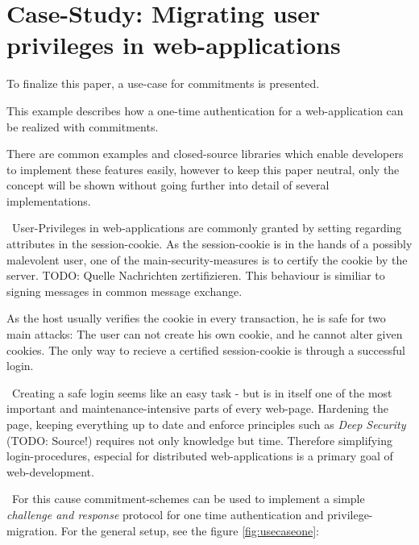 
\section{Case-Study: Migrating user privileges in web-applications}
\label{sec:casestudy}
To finalize this paper, a use-case for commitments is presented. 

This example describes how a one-time authentication for a web-application can be realized with commitments. 

There are common examples and closed-source libraries which enable developers to implement these features easily, however to keep this paper neutral, only the concept will be shown without going further into detail of several implementations. 

~\newline User-Privileges in web-applications are commonly granted by setting regarding attributes in the session-cookie. As the session-cookie is in the hands of a possibly malevolent user, one of the main-security-measures is to certify the cookie by the server. TODO: Quelle Nachrichten zertifizieren. This behaviour is similiar to signing messages in common message exchange. 

As the host usually verifies the cookie in every transaction, he is safe for two main attacks: The user can not create his own cookie, and he cannot alter given cookies. The only way to recieve a certified session-cookie is through a successful login.

~\newline Creating a safe login seems like an easy task - but is in itself one of the most important and maintenance-intensive parts of every web-page. Hardening the page, keeping everything up to date and enforce principles such as \textit{Deep Security} (TODO: Source!) requires not only knowledge but time. Therefore simplifying login-procedures, especial for distributed web-applications is a primary goal of web-development. 

~\newline For this cause commitment-schemes can be used to implement a simple \textit{challenge and response} protocol for one time authentication and privilege-migration. For the general setup, see the figure \ref{fig:usecaseone}: 

